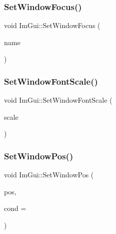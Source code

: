 \mbox{\label{namespace_im_gui_aa612adbb975051090898f094a1608f24}} 
\subsubsection{\texorpdfstring{Set\+Window\+Focus()}{SetWindowFocus()}\hspace{0.1cm}{\footnotesize\ttfamily [2/2]}}
{\footnotesize\ttfamily void Im\+Gui\+::\+Set\+Window\+Focus (\begin{DoxyParamCaption}\item[{const char $\ast$}]{name }\end{DoxyParamCaption})}

\mbox{\label{namespace_im_gui_a11f2f343dbc9b00ccd9e99ebd59cfe8b}} 
\subsubsection{\texorpdfstring{Set\+Window\+Font\+Scale()}{SetWindowFontScale()}}
{\footnotesize\ttfamily void Im\+Gui\+::\+Set\+Window\+Font\+Scale (\begin{DoxyParamCaption}\item[{float}]{scale }\end{DoxyParamCaption})}

\mbox{\label{namespace_im_gui_aaa81e004de4c0a5cedb836e92e8aa0e5}} 
\subsubsection{\texorpdfstring{Set\+Window\+Pos()}{SetWindowPos()}\hspace{0.1cm}{\footnotesize\ttfamily [1/2]}}
{\footnotesize\ttfamily void Im\+Gui\+::\+Set\+Window\+Pos (\begin{DoxyParamCaption}\item[{const \mbox{\hyperlink{struct_im_vec2}{Im\+Vec2}} \&}]{pos,  }\item[{\mbox{\hyperlink{imgui_8h_aef890d6ac872e12c5804d0b3e4f7f103}{Im\+Gui\+Cond}}}]{cond = {} }\end{DoxyParamCaption})}

